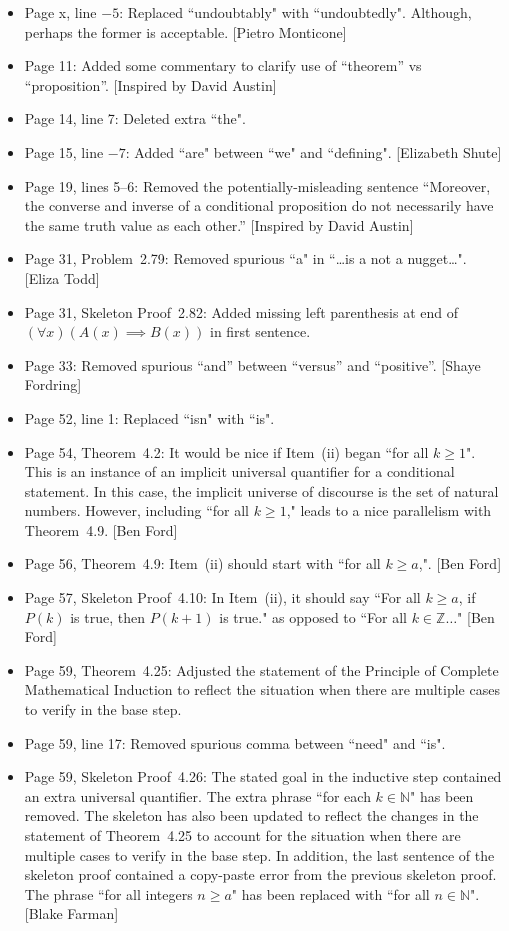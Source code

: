 \documentclass[11pt]{article}%
\begin{document}
\begin{itemize}
\item Page x, line $-5$: Replaced ``undoubtably" with ``undoubtedly". Although, perhaps the former is acceptable. [Pietro Monticone]
\item Page 11: Added some commentary to clarify use of ``theorem'' vs ``proposition''. [Inspired by David Austin]
\item Page 14, line 7: Deleted extra ``the".
\item Page 15, line $-7$: Added ``are" between ``we" and ``defining". [Elizabeth Shute]
\item Page 19, lines 5--6: Removed the potentially-misleading sentence ``Moreover, the converse and inverse of a conditional proposition do not necessarily have the same truth value as each other.'' [Inspired by David Austin]
\item Page 31, Problem~2.79: Removed spurious ``a" in ``\ldots is a not a nugget\ldots". [Eliza Todd]
\item Page 31, Skeleton Proof~2.82: Added missing left parenthesis at end of $(\forall x)(A(x)\implies B(x))$ in first sentence.
\item Page 33: Removed spurious ``and'' between ``versus'' and ``positive''. [Shaye Fordring]
\item Page 52, line 1: Replaced ``isn" with ``is".
\item Page 54, Theorem~4.2: It would be nice if Item~(ii) began ``for all $k\geq 1$".  This is an instance of an implicit universal quantifier for a conditional statement.  In this case, the implicit universe of discourse is the set of natural numbers.  However, including ``for all $k\geq 1$," leads to a nice parallelism with Theorem~4.9. [Ben Ford]
\item Page 56, Theorem~4.9: Item~(ii) should start with ``for all $k\geq a$,". [Ben Ford]
\item Page 57, Skeleton Proof~4.10: In Item~(ii), it should say ``For all $k\geq a$, if $P(k)$ is true, then $P(k+1)$ is true." as opposed to ``For all $k\in\mathbb{Z}\ldots$" [Ben Ford]
\item Page 59, Theorem~4.25: Adjusted the statement of the Principle of Complete Mathematical Induction to reflect the situation when there are multiple cases to verify in the base step.
\item Page 59, line 17: Removed spurious comma between ``need" and ``is".
\item Page 59, Skeleton Proof~4.26: The stated goal in the inductive step contained an extra universal quantifier.  The extra phrase ``for each $k \in \mathbb{N}$" has been removed.  The skeleton has also been updated to reflect the changes in the statement of Theorem~4.25 to account for the situation when there are multiple cases to verify in the base step. In addition, the last sentence of the skeleton proof contained a copy-paste error from the previous skeleton proof.  The phrase ``for all integers $n \ge a$" has been replaced with ``for all $n\in\mathbb{N}$". [Blake Farman]

\end{itemize}
\end{document}
